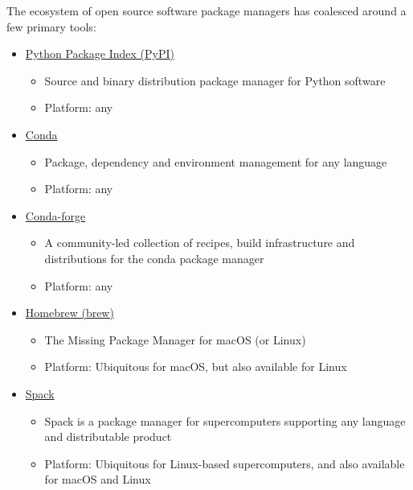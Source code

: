 \documentclass[]{nrel}
\begin{document}
The ecosystem of open source software package managers has coalesced around a few primary tools:
\begin{itemize}
\item \href{https://pypi.org}{Python Package Index (PyPI)}
\begin{itemize}
\item Source and binary distribution package manager for Python software

\item Platform: any

\end{itemize}

\item \href{https://docs.conda.io/en/latest/}{Conda}
\begin{itemize}
\item Package, dependency and environment management for any language

\item Platform: any

\end{itemize}

\item \href{https://conda-forge.org}{Conda-forge}
\begin{itemize}
\item A community-led collection of recipes, build infrastructure and distributions for the conda package manager

\item Platform: any

\end{itemize}

\item \href{https://brew.sh}{Homebrew (brew)}
\begin{itemize}
\item The Missing Package Manager for macOS (or Linux)

\item Platform: Ubiquitous for macOS, but also available for Linux

\end{itemize}

\item \href{https://spack.io}{Spack}
\begin{itemize}
\item Spack is a package manager for supercomputers supporting any language and distributable product

\item Platform: Ubiquitous for Linux-based supercomputers, and also available for macOS and Linux


\end{itemize}
\end{itemize}
\end{document}
